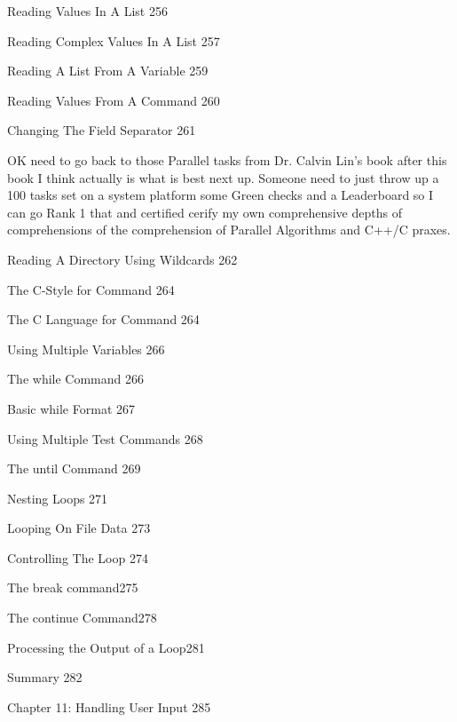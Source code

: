 Reading Values In A List 256



Reading Complex Values In A List 257



Reading A List From A Variable 259



Reading Values From A Command 260



Changing The Field Separator 261

OK need to go back to those Parallel tasks from Dr. Calvin Lin's book after this book I think actually is what is best next up. Someone need to just throw up a 100 tasks set on a system platform some Green checks and a Leaderboard so I can go Rank 1 that and certified cerify my own comprehensive depths of comprehensions of the comprehension of Parallel Algorithms and C++/C praxes.

Reading A Directory Using Wildcards 262



The C-Style for Command 264



The C Language for Command 264



Using Multiple Variables 266



The while Command 266



Basic while Format 267



Using Multiple Test Commands 268



The until Command 269



Nesting Loops 271



Looping On File Data 273



Controlling The Loop 274



The break command275



The continue Command278



Processing the Output of a Loop281



Summary 282



Chapter 11: Handling User Input 285



